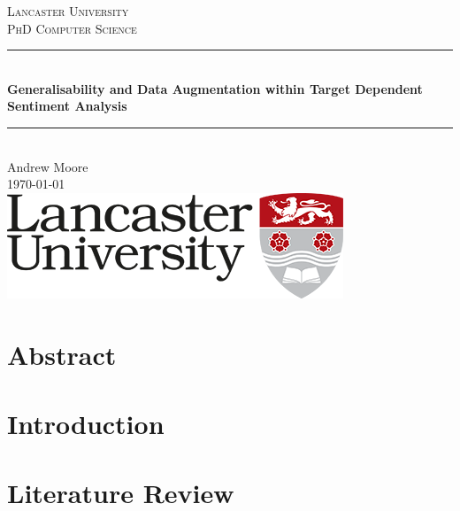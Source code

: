 \documentclass[11pt]{report}
\begin{document}
\begin{titlepage}

\newcommand{\HRule}{\rule{\linewidth}{0.5mm}} %

\center %

\textsc{\LARGE Lancaster University}\\[1.5cm] 
\textsc{\Large PhD Computer Science}\\[0.5cm]

\HRule \\[0.4cm]
{ \huge \bfseries Generalisability and Data Augmentation within Target Dependent Sentiment Analysis}\\[0.4cm] %
\HRule \\[1.5cm]
 
\large Andrew Moore
\hfill \\[0.7cm]
{\large \today}\\[2cm]

\includegraphics{main/uni_logo.png}\\[1cm] 

\vfill %

\end{titlepage}

\chapter*{Abstract}


\tableofcontents

\chapter{Introduction}
\chapter{Literature Review}
\end{document}
